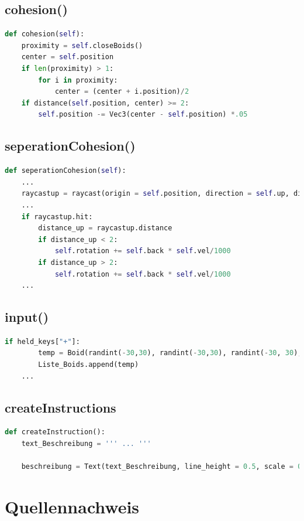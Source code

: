 \documentclass[a4paper, hidelinks, 12pt]{article}
\begin{document}
\subsection{cohesion()}\label{Codecohesion}
\begin{lstlisting}[style=mystyle, language=Python]
def cohesion(self):
	proximity = self.closeBoids()
	center = self.position
	if len(proximity) > 1:
		for i in proximity:
			center = (center + i.position)/2
	if distance(self.position, center) >= 2:
		self.position -= Vec3(center - self.position) *.05
\end{lstlisting}
\subsection{seperationCohesion()}\label{CodeseperationCohesion}
\begin{lstlisting}[style=mystyle, language=Python]
def seperationCohesion(self):
	...
	raycastup = raycast(origin = self.position, direction = self.up, distance = 5, traverse_target = scene, ignore = (Wireframe,))
	...
	if raycastup.hit:
		distance_up = raycastup.distance
		if distance_up < 2:
			self.rotation += self.back * self.vel/1000
		if distance_up > 2:
			self.rotation += self.back * self.vel/1000
	...
\end{lstlisting}
\newpage
\subsection{input()}\label{Codeinput}
\begin{lstlisting}[style=mystyle, language=Python]
	if held_keys["+"]:
		temp = Boid(randint(-30,30), randint(-30,30), randint(-30, 30), randint(0,360), randint(0,360), randint(0,360), uniform(50.0, 300.0), uniform(0.0, 10.0), 300.0, 1, groesse)
		Liste_Boids.append(temp)
	...
\end{lstlisting}
\subsection{createInstructions}\label{CodeCreateInstructions}
\begin{lstlisting}[style=mystyle, language=Python]
def createInstruction():
	text_Beschreibung = ''' ... '''

	beschreibung = Text(text_Beschreibung, line_height = 0.5, scale = 0.7, x = -.8, y = -.12, color = color.white)
\end{lstlisting}
\newpage

\section{Quellennachweis}
\scriptsize
\newpage
\end{document}
